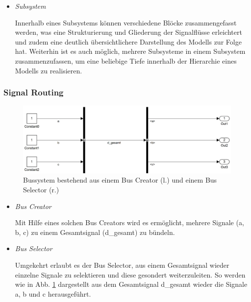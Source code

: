 \documentclass[fontsize = 12pt, paper = a4]{scrreprt}
\begin{document}
\begin{itemize}
\item[3)] \textit{Subsystem}

Innerhalb eines Subsystems können verschiedene Blöcke zusammengefasst werden, was eine Strukturierung und Gliederung der Signalflüsse erleichtert und zudem eine deutlich übersichtlichere Darstellung des Modells zur Folge hat. Weiterhin ist es auch möglich, mehrere Subsysteme in einem Subsystem zusammenzufassen, um eine beliebige Tiefe innerhalb der Hierarchie eines Modells zu realisieren. \\

\end{itemize}

\newpage

\subsubsection{Signal Routing}

\begin{figure}[h]
\centering
\includegraphics[scale = 0.45]{bus_gesamt}
\caption[Bussystem]
{Bussystem bestehend aus einem Bus Creator (l.) und einem Bus Selector (r.)}
\label{Signal Routing}
\end{figure}


\begin{itemize}

\item[1)] \textit{Bus Creator}

Mit Hilfe eines solchen Bus Creators wird es ermöglicht, mehrere Signale (a, b, c) zu einem Gesamtsignal (d\_gesamt) zu bündeln.

\item[2)] \textit{Bus Selector}

Umgekehrt erlaubt es der Bus Selector, aus einem Gesamtsignal wieder einzelne Signale zu selektieren und diese gesondert weiterzuleiten. So werden wie in Abb. \ref{Signal Routing} dargestellt aus dem Gesamtsignal d\_gesamt wieder die Signale a, b und c herausgeführt. 

\end{itemize}
\end{document}
